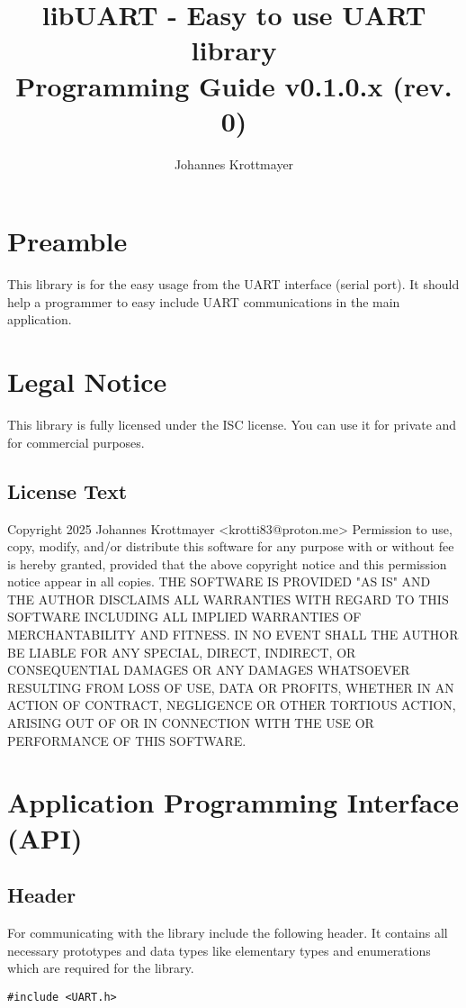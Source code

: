 \documentclass{report}
\title{libUART - Easy to use UART library \\ Programming Guide v0.1.0.x (rev. 0)}
\author{Johannes Krottmayer}
\begin{document}
\maketitle
\tableofcontents
\chapter{Preamble}
This library is for the easy usage from the UART interface (serial port). It should help
a programmer to easy include UART communications in the main application.
\chapter{Legal Notice}
This library is fully licensed under the ISC license. You can use it for private and
for commercial purposes.
\section{License Text}
Copyright 2025 Johannes Krottmayer <krotti83@proton.me>\newline
\newline
Permission to use, copy, modify, and/or distribute this software for any
purpose with or without fee is hereby granted, provided that the above
copyright notice and this permission notice appear in all copies.\newline
\newline
THE SOFTWARE IS PROVIDED "AS IS" AND THE AUTHOR DISCLAIMS ALL WARRANTIES
WITH REGARD TO THIS SOFTWARE INCLUDING ALL IMPLIED WARRANTIES OF
MERCHANTABILITY AND FITNESS. IN NO EVENT SHALL THE AUTHOR BE LIABLE FOR
ANY SPECIAL, DIRECT, INDIRECT, OR CONSEQUENTIAL DAMAGES OR ANY DAMAGES
WHATSOEVER RESULTING FROM LOSS OF USE, DATA OR PROFITS, WHETHER IN AN
ACTION OF CONTRACT, NEGLIGENCE OR OTHER TORTIOUS ACTION, ARISING OUT OF
OR IN CONNECTION WITH THE USE OR PERFORMANCE OF THIS SOFTWARE.
\chapter{Application Programming Interface (API)}
\section{Header}
For communicating with the library include the following header. It
contains all necessary prototypes and data types like elementary types
and enumerations which are required for the library.
\begin{lstlisting}
#include <UART.h>
\end{lstlisting}
\end{document}
